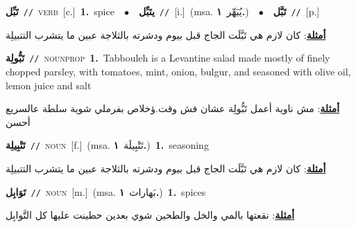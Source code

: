 \documentclass[10pt,a4paper,twoside]{article} %
\begin{document}
\begin{multicols}{2}
{{\setlength\topsep{0pt}\textbf{\foreignlanguage{arabic}{تَبِّل}}\ {\color{gray}\texttt{//}\color{black}}\ \textsc{verb}\ [c.]\ \textbf{1.}~spice\ \ $\bullet$\ \ \setlength\topsep{0pt}\textbf{\foreignlanguage{arabic}{يتَبِّل}}\ {\color{gray}\texttt{//}\color{black}}\ [i.]\ \color{gray}(msa. \foreignlanguage{arabic}{يُبَهِّر}~\foreignlanguage{arabic}{\textbf{١.}})\color{black}\ \ $\bullet$\ \ \setlength\topsep{0pt}\textbf{\foreignlanguage{arabic}{تَبَّل}}\ {\color{gray}\texttt{//}\color{black}}\ [p.]\  \begin{flushright}\color{gray}\foreignlanguage{arabic}{\textbf{\underline{\foreignlanguage{arabic}{أمثلة}}}: كان لازم هي تَبَّلَت الجاج قبل بيوم ودشرته بالثلاجة عبين ما يتشرب التتبيلِة}\end{flushright}\color{black}} \vspace{2mm}

{\setlength\topsep{0pt}\textbf{\foreignlanguage{arabic}{تَبُّولِة}}\ {\color{gray}\texttt{//}\color{black}}\ \textsc{noun\textunderscore prop}\ \textbf{1.}~Tabbouleh is a Levantine salad made mostly of finely chopped parsley, with tomatoes, mint, onion, bulgur, and seasoned with olive oil, lemon juice and salt\  \begin{flushright}\color{gray}\foreignlanguage{arabic}{\textbf{\underline{\foreignlanguage{arabic}{أمثلة}}}: مش ناوية أعمل تَبُّولِة عشان فش وقت.ؤخلاص بفرملي شوية سلطة عالسريع أحسن}\end{flushright}\color{black}} \vspace{2mm}

{\setlength\topsep{0pt}\textbf{\foreignlanguage{arabic}{تَتْبِيلِة}}\ {\color{gray}\texttt{//}\color{black}}\ \textsc{noun}\ [f.]\ \color{gray}(msa. \foreignlanguage{arabic}{تَتْبِيلَة}~\foreignlanguage{arabic}{\textbf{١.}})\color{black}\ \textbf{1.}~seasoning\  \begin{flushright}\color{gray}\foreignlanguage{arabic}{\textbf{\underline{\foreignlanguage{arabic}{أمثلة}}}: كان لازم هي تَبَّلَت الجاج قبل بيوم ودشرته بالثلاجة عبين ما يتشرب التتبيلِة}\end{flushright}\color{black}} \vspace{2mm}

{\setlength\topsep{0pt}\textbf{\foreignlanguage{arabic}{تَوَابِل}}\ {\color{gray}\texttt{//}\color{black}}\ \textsc{noun}\ [m.]\ \color{gray}(msa. \foreignlanguage{arabic}{بَهارات}~\foreignlanguage{arabic}{\textbf{١.}})\color{black}\ \textbf{1.}~spices\  \begin{flushright}\color{gray}\foreignlanguage{arabic}{\textbf{\underline{\foreignlanguage{arabic}{أمثلة}}}: نقعتها بالمي والخل والطحين شوي بعدين حطينت عليها كل التَّوابِل}\end{flushright}\color{black}} \vspace{2mm}

}
\end{multicols}
\end{document}
